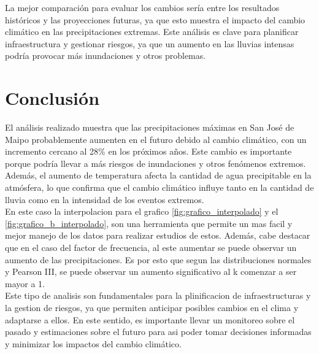 \documentclass{article}  %
\begin{document}
La mejor comparación para evaluar los cambios sería entre los resultados históricos y las proyecciones futuras, ya que esto muestra el impacto del cambio climático en las precipitaciones extremas. Este análisis es clave para planificar infraestructura y gestionar riesgos, ya que un aumento en las lluvias intensas podría provocar más inundaciones y otros problemas.

\newpage
\section{Conclusión}

El análisis realizado muestra que las precipitaciones máximas en San José de Maipo probablemente aumenten en el futuro debido al cambio climático, con un incremento cercano al 28\% en los próximos años. Este cambio es importante porque podría llevar a más riesgos de inundaciones y otros fenómenos extremos. Además, el aumento de temperatura afecta la cantidad de agua precipitable en la atmósfera, lo que confirma que el cambio climático influye tanto en la cantidad de lluvia como en la intensidad de los eventos extremos. \\
En este caso la interpolacion para el grafico \ref{fig:grafico_interpolado} y el \ref{fig:grafico_b_interpolado}, son una herramienta que permite un mas facil y mejor manejo de los datos para realizar estudios de estos. Además, cabe destacar que en el caso del factor de frecuencia, al este aumentar se puede observar un aumento de las precipitaciones. Es por esto que segun las distribuciones normales y Pearson III, se puede observar un aumento significativo al k comenzar a ser mayor a 1. \\
Este tipo de analisis son fundamentales para la plinificacion de infraestructuras y la gestion de riesgos, ya que permiten anticipar posibles cambios en el clima y adaptarse a ellos. En este sentido, es importante llevar un monitoreo sobre el pasado y estimaciones sobre el futuro para asi poder tomar decisiones informadas y minimizar los impactos del cambio climático.
\end{document}
